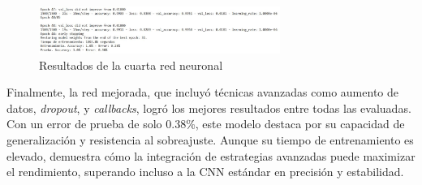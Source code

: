 \begin{figure}[H]
	\centering
	\includegraphics[width=0.7\textwidth]{imgs/results-red5.JPG}
	\caption{Resultados de la cuarta red neuronal}
	\label{fig:results-red5}
\end{figure}

Finalmente, la red mejorada, que incluyó técnicas avanzadas como aumento de datos, \textit{dropout}, y \textit{callbacks}, logró los mejores resultados entre todas las evaluadas. Con un error de prueba de solo 0.38\%, este modelo destaca por su capacidad de generalización y resistencia al sobreajuste. Aunque su tiempo de entrenamiento es elevado, demuestra cómo la integración de estrategias avanzadas puede maximizar el rendimiento, superando incluso a la CNN estándar en precisión y estabilidad.

